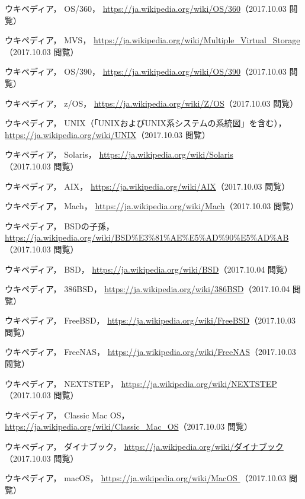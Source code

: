 \begin{thebibliography}{9}

ウキペディア，
OS/360，
\url{https://ja.wikipedia.org/wiki/OS/360}（2017.10.03 閲覧）

ウキペディア，
MVS，
\url{https://ja.wikipedia.org/wiki/Multiple_Virtual_Storage}（2017.10.03 閲覧）

ウキペディア，
OS/390，
\url{https://ja.wikipedia.org/wiki/OS/390}（2017.10.03 閲覧）

ウキペディア，
z/OS，
\url{https://ja.wikipedia.org/wiki/Z/OS}（2017.10.03 閲覧）

ウキペディア，
UNIX（「UNIXおよびUNIX系システムの系統図」を含む），
\url{https://ja.wikipedia.org/wiki/UNIX}（2017.10.03 閲覧）

ウキペディア，
Solaris，
\url{https://ja.wikipedia.org/wiki/Solaris}（2017.10.03 閲覧）

ウキペディア，
AIX，
\url{https://ja.wikipedia.org/wiki/AIX}（2017.10.03 閲覧）

ウキペディア，
Mach，
\url{https://ja.wikipedia.org/wiki/Mach}（2017.10.03 閲覧）

ウキペディア，
BSDの子孫，
\url{https://ja.wikipedia.org/wiki/BSD%E3%81%AE%E5%AD%90%E5%AD%AB}（2017.10.03 閲覧）

ウキペディア，
BSD，
\url{https://ja.wikipedia.org/wiki/BSD}（2017.10.04 閲覧）

ウキペディア，
386BSD，
\url{https://ja.wikipedia.org/wiki/386BSD}（2017.10.04 閲覧）

ウキペディア，
FreeBSD，
\url{https://ja.wikipedia.org/wiki/FreeBSD}（2017.10.03 閲覧）

ウキペディア，
FreeNAS，
\url{https://ja.wikipedia.org/wiki/FreeNAS}（2017.10.03 閲覧）

ウキペディア，
NEXTSTEP，
\url{https://ja.wikipedia.org/wiki/NEXTSTEP}（2017.10.03 閲覧）

ウキペディア，
Classic Mac OS，
\url{https://ja.wikipedia.org/wiki/Classic_Mac_OS}（2017.10.03 閲覧）

ウキペディア，
ダイナブック，
\url{
https://ja.wikipedia.org/wiki/ダイナブック
}（2017.10.03 閲覧）

ウキペディア，
macOS，
\url{
https://ja.wikipedia.org/wiki/MacOS
}（2017.10.03 閲覧）


\end{thebibliography}
